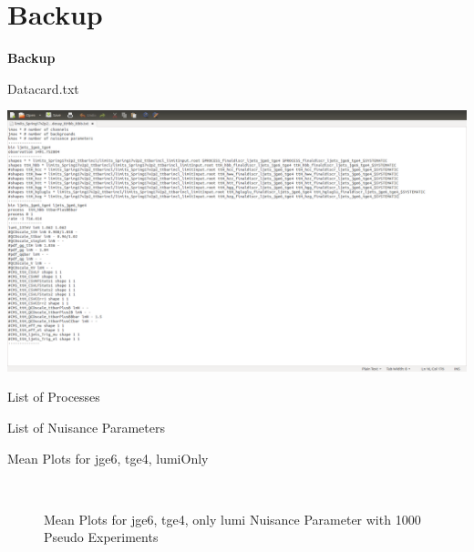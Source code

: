 \section{Backup}
\begin{frame}
	\begin{center}
		\textbf{\Huge Backup}
	\end{center}
\end{frame}

\begin{frame}{Datacard.txt}

\includegraphics[scale = 0.2]{datacard.png}

\end{frame}



\begin{frame}{List of Processes}

\end{frame}

\begin{frame}{List of Nuisance Parameters}

\end{frame}

\begin{frame}{Mean Plots for jge6, tge4, lumiOnly}

\begin{figure}
\centering
{} $\qquad$
\scriptsize\caption[jge6$\_$tge4$\_$N1000$\_$lumiOnly]{Mean Plots for jge6, tge4, only lumi Nuisance Parameter with 1000 Pseudo Experiments}
\end{figure}

\end{frame}

